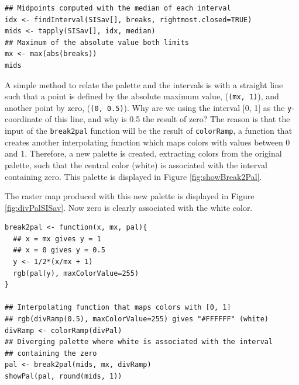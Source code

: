 \lstset{language=R,numbers=none}
\begin{lstlisting}
## Midpoints computed with the median of each interval
idx <- findInterval(SISav[], breaks, rightmost.closed=TRUE)
mids <- tapply(SISav[], idx, median)
## Maximum of the absolute value both limits
mx <- max(abs(breaks))
mids
\end{lstlisting}

A simple method to relate the palette and the intervals is with a
straight line such that a point is defined by the absolute maximum
value, (\texttt{(mx, 1)}), and another point by zero, (\texttt{(0, 0.5)}).  Why are
we using the interval [0, 1] as the \texttt{y}-coordinate of this line, and
why is 0.5 the result of zero? The reason is that the input of the
\texttt{break2pal} function will be the result of \texttt{colorRamp}, a function
that creates another interpolating function which maps colors with
values between 0 and 1. Therefore, a new palette is created,
extracting colors from the original palette, such that the central
color (white) is associated with the interval containing zero. This
palette is displayed in Figure \ref{fig:showBreak2Pal}.

The raster map produced with this new palette is displayed in Figure
\ref{fig:divPalSISav}. Now zero is clearly associated with the white
color.
\lstset{language=R,numbers=none}
\begin{lstlisting}
break2pal <- function(x, mx, pal){
  ## x = mx gives y = 1
  ## x = 0 gives y = 0.5
  y <- 1/2*(x/mx + 1)
  rgb(pal(y), maxColorValue=255)
}

## Interpolating function that maps colors with [0, 1]
## rgb(divRamp(0.5), maxColorValue=255) gives "#FFFFFF" (white)
divRamp <- colorRamp(divPal)
## Diverging palette where white is associated with the interval
## containing the zero
pal <- break2pal(mids, mx, divRamp)
showPal(pal, round(mids, 1))
\end{lstlisting}


